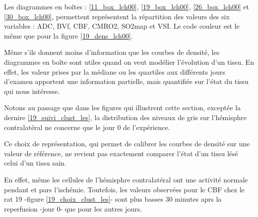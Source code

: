 \par
Les diagrammes en bo\^ites : \ref{11_box_lch00}, \ref{19_box_lch00}, \ref{26_box_lch00} et \ref{30_box_lch00}, %
permettent repr\'esentent la r\'epartition des valeurs des six variables : ADC, BVf, CBF, CMRO2, SO2map et VSI. %
Le code couleur est le m\^eme que pour la figure \ref{19_dens_lch00}.

\par
M\^eme s'ils donnent moins d'information que les courbes de densit\'e, les diagrammes en bo\^ite sont utiles quand on veut mod\'elier l'\'evolution d'un tissu. %
En effet, les valeur prises par la m\'ediane ou les quartiles aux diff\'erents jours d'examen apportent une information partielle, %
mais quantifi\'ee sur l'\'etat du tissu qui nous int\'eresse.

\par
Notons au passage que dans les figures qui illustrent cette section, except\'ee la dernire \ref{19_suivi_clust_les}, %
la distribution des niveaux de gris sur l'h\'emisphre contralat\'eral ne concerne que le jour 0 de l'exp\'erience.

\par
Ce choix de repr\'esentation, qui permet de calibrer les courbes de densit\'e sur une valeur de r\'ef\'erence, %
ne revient pas exactement  comparer l'\'etat d'un tissu l\'es\'e  celui d'un tissu sain.

\par
En effet, m\^eme les cellules de l'h\'emisphre contralat\'eral ont une activit\'e normale pendant et pars l'isch\'emie. %
Toutefois, les valeurs observ\'ees pour le CBF chez le rat 19 -figure \ref{19_choix_clust_les}- sont plus basses 30 minutes aprs la reperfusion -jour 0- %
que pour les autres jours.


